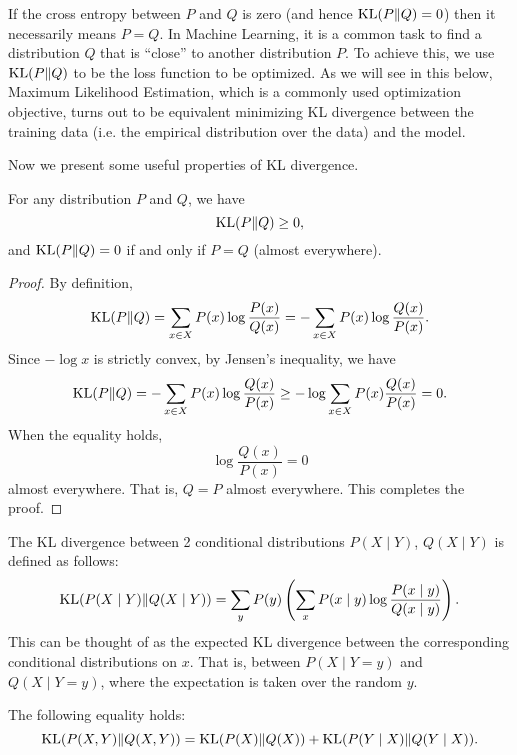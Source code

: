 \documentclass[a4paper]{article}
\begin{document}
If the cross entropy between $P$ and $Q$ is zero 
(and hence $\operatorname{KL}(P \Vert Q) = 0$) then it necessarily 
means $P = Q$. In Machine Learning, it is a common 
task to find a distribution $Q$ that is ``close'' to 
another distribution $P$. To achieve this, we use 
$\operatorname{KL}(P \Vert Q)$ to be the loss function to be optimized. 
As we will see in this below, Maximum Likelihood 
Estimation, which is a commonly used optimization objective, 
turns out to be equivalent minimizing KL divergence between 
the training data (i.e. the empirical distribution over the 
data) and the model.

Now we present some useful properties of KL divergence.

\begin{thm}
  For any distribution $P$ and $Q$, we have 
  \[
  \operatorname{KL}(P \Vert Q) \geq 0,
  \]
  and $\operatorname{KL}(P \Vert Q) = 0$ if and only if $P = Q$ (almost 
  everywhere).
\end{thm}

\begin{proof}
  By definition,
  \[
    \operatorname{KL}(P \Vert Q) = \sum_{x \in X} P(x) \log \frac{P(x)}{Q(x)} = - \sum_{x \in X} P(x) \log \frac{Q(x)}{P(x)}.
  \] 
  Since $-\log x$ is strictly convex, by Jensen's inequality, we have
  \[
  \begin{aligned}
    \operatorname{KL}(P \Vert Q) = - \sum_{x \in X} P(x) \log \frac{Q(x)}{P(x)}
    \geq -\log \sum_{x \in X} P(x) \frac{Q(x)}{P(x)} = 0.
  \end{aligned}
  \]
  When the equality holds, 
  \[
  \log \frac{Q(x)}{P(x)} = 0
  \]
  almost everywhere. 
  That is, $Q = P$ almost everywhere. 
  This completes the proof.
\end{proof}

\begin{defi}
  The KL divergence between 2 conditional distributions 
  $P(X \mid Y)$, $Q(X \mid Y)$ is defined as follows:
  \[
  \operatorname{KL}({P(X \mid Y)} \Vert {Q(X \mid Y)}) = \sum_y P(y) 
  \left( \sum_x P(x \mid y) \log 
  \frac{P(x \mid y)}{Q(x \mid y)} \right).
  \]
  This can be thought of as the expected KL divergence 
  between the corresponding conditional distributions on 
  $x$. That is, between $P(X \mid Y = y)$ and $Q(X \mid Y = y)$, 
  where the expectation is taken over the random $y$.
\end{defi}

\begin{thm}
The following equality holds:
\[
\operatorname{KL}({P(X, Y)} \Vert {Q(X, Y)}) = 
\operatorname{KL}({P(X)} \Vert {Q(X)}) + \operatorname{KL}({P(Y \mid X)} 
\Vert {Q(Y \mid X)}).
\]
\end{thm}
\end{document}
